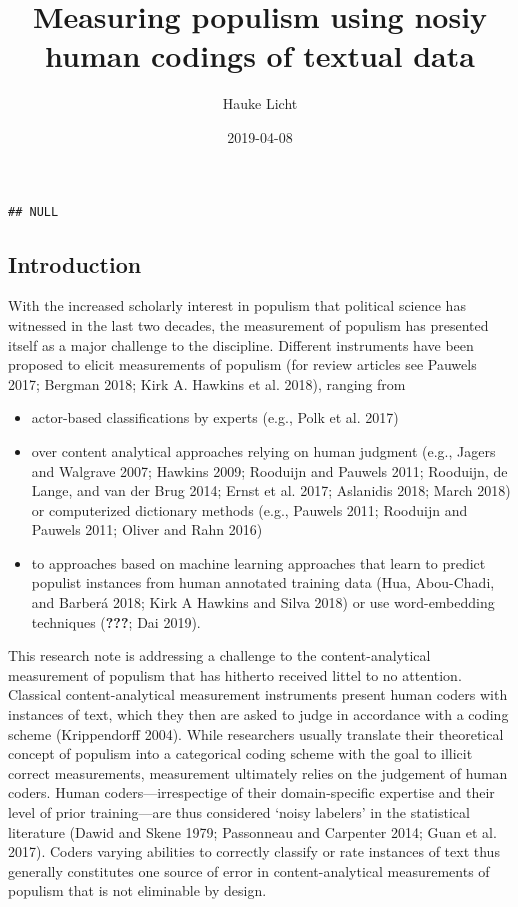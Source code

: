 \documentclass[]{article}
\title{Measuring populism using nosiy human codings of textual data}
\author{Hauke Licht}
\date{2019-04-08}
\providecommand{\tightlist}{%
  \setlength{\itemsep}{0pt}\setlength{\parskip}{0pt}}
\begin{document}
\maketitle

\begin{verbatim}
## NULL
\end{verbatim}

\hypertarget{introduction}{%
\subsection{Introduction}\label{introduction}}

With the increased scholarly interest in populism that political science
has witnessed in the last two decades, the measurement of populism has
presented itself as a major challenge to the discipline. Different
instruments have been proposed to elicit measurements of populism (for
review articles see Pauwels 2017; Bergman 2018; Kirk A. Hawkins et al.
2018), ranging from

\begin{itemize}
\tightlist
\item
  actor-based classifications by experts (e.g., Polk et al. 2017)
\item
  over content analytical approaches relying on human judgment (e.g.,
  Jagers and Walgrave 2007; Hawkins 2009; Rooduijn and Pauwels 2011;
  Rooduijn, de Lange, and van der Brug 2014; Ernst et al. 2017;
  Aslanidis 2018; March 2018) or computerized dictionary methods (e.g.,
  Pauwels 2011; Rooduijn and Pauwels 2011; Oliver and Rahn 2016)
\item
  to approaches based on machine learning approaches that learn to
  predict populist instances from human annotated training data (Hua,
  Abou-Chadi, and Barberá 2018; Kirk A Hawkins and Silva 2018) or use
  word-embedding techniques ({\textbf{???}}; Dai 2019).
\end{itemize}

This research note is addressing a challenge to the content-analytical
measurement of populism that has hitherto received littel to no
attention. Classical content-analytical measurement instruments present
human coders with instances of text, which they then are asked to judge
in accordance with a coding scheme (Krippendorff 2004). While
researchers usually translate their theoretical concept of populism into
a categorical coding scheme with the goal to illicit correct
measurements, measurement ultimately relies on the judgement of human
coders. Human coders---irrespectige of their domain-specific expertise
and their level of prior training---are thus considered `noisy labelers'
in the statistical literature (Dawid and Skene 1979; Passonneau and
Carpenter 2014; Guan et al. 2017). Coders varying abilities to correctly
classify or rate instances of text thus generally constitutes one source
of error in content-analytical measurements of populism that is not
eliminable by design.
\end{document}
